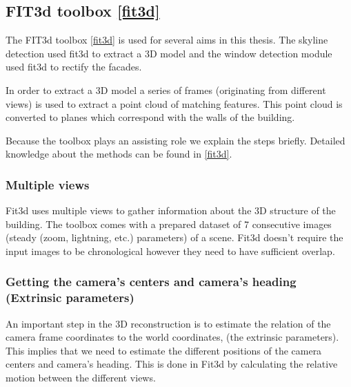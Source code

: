 %  
%  


\subsection{FIT3d toolbox \ref{fit3d}}
\label{sec:prelimFit3d}
The FIT3d toolbox \ref{fit3d} is used for several aims in this thesis.
The skyline detection used fit3d to extract a 3D model 
and the window detection module used fit3d to rectify the facades.

In order to extract a 3D model a series of frames (originating from different
views) is used to extract a point cloud of matching features. This
point cloud is converted to planes which correspond with the walls of the building.

Because the toolbox plays an assisting role we explain the steps briefly.
Detailed knowledge about the methods can be found in \ref{fit3d}.

\subsubsection{Multiple views}
Fit3d uses multiple views to gather information about the 3D structure of the
building. The toolbox comes with a prepared dataset of 7 consecutive images (steady (zoom, lightning,
etc.) parameters) of a scene.  Fit3d doesn't require the input images to be
chronological however they need to have sufficient overlap. 


\subsubsection{Getting the camera's centers and camera's heading (Extrinsic parameters)}
An important step in the 3D reconstruction is to estimate 
the relation of the camera frame coordinates to the world coordinates, (the
extrinsic parameters).
This implies that we need to estimate the different positions of the camera
centers and camera's heading.
This is done in Fit3d by calculating the relative motion between the different views.

